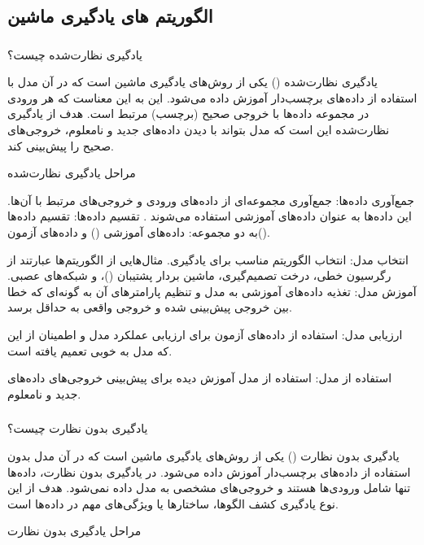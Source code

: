 \documentclass[a4paper, titlepage]{article}
\begin{document}
\subsection{الگوریتم های یادگیری ماشین}
\subsubsection{}

یادگیری نظارت‌شده چیست؟

یادگیری نظارت‌شده () یکی از روش‌های یادگیری ماشین است که در آن مدل با استفاده از داده‌های برچسب‌دار آموزش داده می‌شود. این به این معناست که هر ورودی در مجموعه داده‌ها با خروجی صحیح (برچسب) مرتبط است. هدف از یادگیری نظارت‌شده این است که مدل بتواند با دیدن داده‌های جدید و نامعلوم، خروجی‌های صحیح را پیش‌بینی کند.

مراحل یادگیری نظارت‌شده

جمع‌آوری داده‌ها: جمع‌آوری مجموعه‌ای از داده‌های ورودی و خروجی‌های مرتبط با آن‌ها. این داده‌ها به عنوان داده‌های آموزشی استفاده می‌شوند
.
تقسیم داده‌ها: تقسیم داده‌ها به دو مجموعه: داده‌های آموزشی () و داده‌های آزمون().

انتخاب مدل: انتخاب الگوریتم مناسب برای یادگیری. مثال‌هایی از الگوریتم‌ها عبارتند از رگرسیون خطی، درخت تصمیم‌گیری، ماشین بردار پشتیبان ()، و شبکه‌های عصبی.
آموزش مدل: تغذیه داده‌های آموزشی به مدل و تنظیم پارامترهای آن به گونه‌ای که خطا بین خروجی پیش‌بینی شده و خروجی واقعی به حداقل برسد.

ارزیابی مدل: استفاده از داده‌های آزمون برای ارزیابی عملکرد مدل و اطمینان از این که مدل به خوبی تعمیم یافته است.

استفاده از مدل: استفاده از مدل آموزش دیده برای پیش‌بینی خروجی‌های داده‌های جدید و نامعلوم.

\subsubsection{}

یادگیری بدون نظارت چیست؟

یادگیری بدون نظارت () یکی از روش‌های یادگیری ماشین است که در آن مدل بدون استفاده از داده‌های برچسب‌دار آموزش داده می‌شود. در یادگیری بدون نظارت، داده‌ها تنها شامل ورودی‌ها هستند و خروجی‌های مشخصی به مدل داده نمی‌شود. هدف از این نوع یادگیری کشف الگوها، ساختارها یا ویژگی‌های مهم در داده‌ها است.

مراحل یادگیری بدون نظارت
\end{document}

